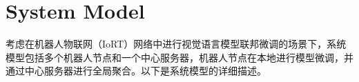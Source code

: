 \documentclass[lettersize,journal]{IEEEtran}
\begin{document}


\section{System Model}

考虑在机器人物联网（IoRT）网络中进行视觉语言模型联邦微调的场景下，系统模型包括多个机器人节点和一个中心服务器，机器人节点在本地进行模型微调，并通过中心服务器进行全局聚合。以下是系统模型的详细描述。
\end{document}
